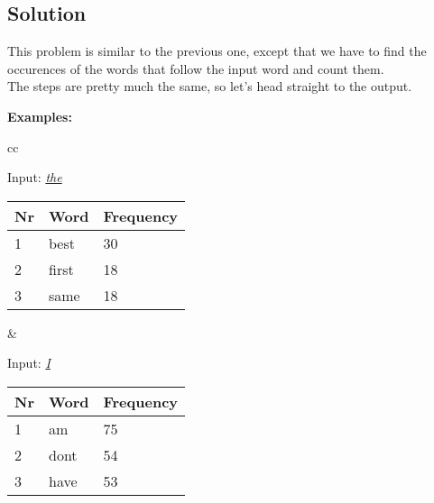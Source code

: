 \documentclass{article}
\begin{document}
    \vspace{4em}


    \subsection{Solution}
      This problem is similar to the previous one, except that we have to find the
      occurences of the words that follow the input word and count them.\\
      The steps are pretty much the same, so let's head straight
      to the output.

      \vspace{1em}

      \centerline{\textbf{Examples:}}

      \vspace{2em}

        \begin{tabular}{cc}
          \begin{minipage}{.5\linewidth}
            \hspace{4em}Input: \emph{\underline{the}}\\
            \begin{tabular}{l|l|l}
              Nr & Word & Frequency \\ \hline
              1 & best & 30 \\ \hline
              2 & first & 18 \\ \hline
              3 & same & 18 \\
            \end{tabular}
          \end{minipage} &

          \begin{minipage}{.5\linewidth}
            \hspace{4em}Input: \emph{\underline{I}}\\
            \begin{tabular}{l|l|l}
              Nr & Word & Frequency \\ \hline
              1 & am & 75 \\ \hline
              2 & don\textquotesingle t & 54 \\ \hline
              3 & have & 53 \\
            \end{tabular}
          \end{minipage}
        \end{tabular}

        \vspace{2em}
\end{document}
